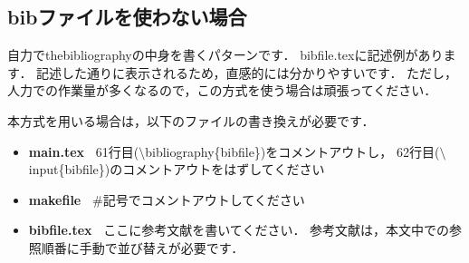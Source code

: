 \subsection{bibファイルを使わない場合}
自力でthebibliographyの中身を書くパターンです．
bibfile.texに記述例があります．
記述した通りに表示されるため，直感的には分かりやすいです．
ただし，人力での作業量が多くなるので，この方式を使う場合は頑張ってください．

本方式を用いる場合は，以下のファイルの書き換えが必要です．

\begin{itemize}
        \item {\bf main.tex\ }  61行目($\setminus$bibliography\{bibfile\})をコメントアウトし，
                                                62行目($\setminus$input\{bibfile\})のコメントアウトをはずしてください
        \item {\bf makefile\ }  $\#$記号でコメントアウトしてください
        \item {\bf bibfile.tex\ }       ここに参考文献を書いてください．
                                                参考文献は，本文中での参照順番に手動で並び替えが必要です．
\end{itemize}

